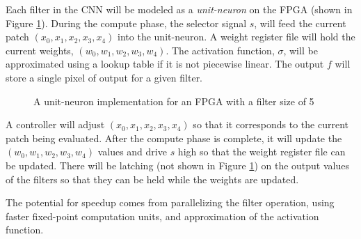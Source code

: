 Each filter in the CNN will be modeled as a \textit{unit-neuron} on the FPGA (shown in Figure \ref{fig:unit-neuron}). During the compute phase, the selector signal $s$, will feed the current patch $(x_0, x_1, x_2, x_3, x_4)$ into the unit-neuron. A weight register file will hold the current weights, $(w_0, w_1, w_2, w_3, w_4)$. The activation function, $\sigma$, will be approximated using a lookup table if it is not piecewise linear. The output $f$ will store a single pixel of output for a given filter.
\begin{figure}[hb]
	\centering
	\caption{A unit-neuron implementation for an FPGA with a filter size of 5}
	\label{fig:unit-neuron}
\end{figure}

A controller will adjust $(x_0, x_1, x_2, x_3, x_4)$ so that it corresponds to the current patch being evaluated. After the compute phase is complete, it will update the $(w_0, w_1, w_2, w_3, w_4)$ values and drive $s$ high so that the weight register file can be updated. There will be latching (not shown in Figure \ref{fig:unit-neuron}) on the output values of the filters so that they can be held while the weights are updated.

The potential for speedup comes from parallelizing the filter operation, using faster fixed-point computation units, and approximation of the activation function.